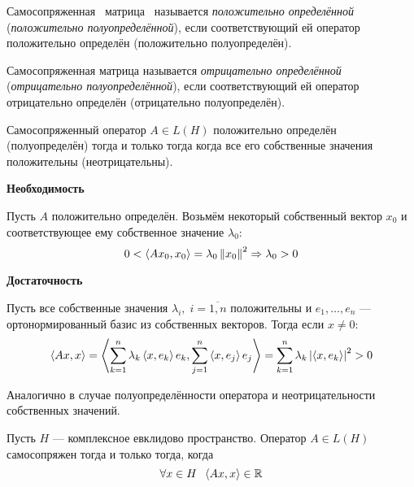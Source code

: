\begin{definition}
    Самосопряженная \, матрица \, называется \emph{положительно определённой}
    (\emph{положительно полуопределённой}), если соответствующий ей оператор положительно определён
    (положительно полуопределён).

    Самосопряженная матрица называется \emph{отрицательно определённой}
    (\emph{отрицательно полуопределённой}), если соответствующий ей оператор
    отрицательно определён
    (отрицательно полуопределён).
\end{definition}

\begin{theorem}
    Самосопряженный оператор $A \in L(H)$ положительно определён (полуопределён)
    тогда и только тогда когда все его собственные значения положительны
    (неотрицательны).
\end{theorem}

\begin{proofbreak}
    \dindent \textbf{Необходимость}

    Пусть $A$ положительно определён. Возьмём некоторый собственный вектор $x_0$
    и соответствующее ему собственное значение $\lambda_0$:
    \[ 0 < \left< Ax_0, x_0 \right> = \lambda_0 \left\|x_0\right\|^2 \Rightarrow
    \lambda_0 > 0 \]

    \textbf{Достаточность}

    Пусть все собственные значения $\lambda_i, \; i = \overline{1,n}$
    положительны и $e_1, \dotsc, e_n$ --- ортонормированный базис из собственных
    векторов. Тогда если $x \neq 0$:
    \[ \left< Ax, x\right> = \left< \sum_{k=1}^n \lambda_k \left<
        x, e_k\right> e_k, \sum_{j=1}^n \left< x, e_j\right> e_j \right> =
    \sum_{k=1}^n \lambda_k \left|\left< x, e_k\right>\right|^2 > 0 \]

    Аналогично в случае полуопределённости оператора и неотрицательности
    собственных значений.
\end{proofbreak}

\begin{theorem}
    Пусть $H$ --- комплексное евклидово пространство. Оператор $A\in L(H)$
    самосопряжен тогда и только тогда, когда
    \[ \forall x \in H \;\; \left< Ax, x\right> \in \mathbb{R} \]
\end{theorem}

